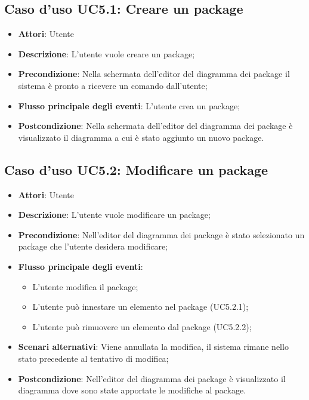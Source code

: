 \documentclass[../AnalisiDeiRequisiti.tex]{subfiles}
\begin{document}
			\subsection{Caso d'uso UC5.1: Creare un package}
			\begin{itemize}
				\item \textbf{Attori}: Utente
				\item \textbf{Descrizione}: L'utente vuole creare un package;
				\item \textbf{Precondizione}: Nella schermata dell'editor del diagramma dei package il sistema è pronto a ricevere un comando dall'utente;
				\item \textbf{Flusso principale degli eventi}: L'utente crea un package;
				\item \textbf{Postcondizione}: Nella schermata dell'editor del diagramma dei package è visualizzato il diagramma a cui è stato aggiunto un nuovo package.
			\end{itemize}
			\subsection{Caso d'uso UC5.2: Modificare un package}
			\begin{itemize}
				\item \textbf{Attori}: Utente
				\item \textbf{Descrizione}: L'utente vuole modificare un package;
				\item \textbf{Precondizione}: Nell'editor del diagramma dei package è stato selezionato un package che l'utente desidera modificare;
				\item \textbf{Flusso principale degli eventi}: \begin{itemize}
					\item L'utente modifica il package;
					\item L'utente può innestare un elemento nel package (UC5.2.1);
					\item L'utente può rimuovere un elemento dal package (UC5.2.2);
				\end{itemize}
				\item \textbf{Scenari alternativi}: Viene annullata la modifica, il sistema	rimane nello stato precedente al tentativo di modifica;
				\item \textbf{Postcondizione}: Nell'editor del diagramma dei package è visualizzato il diagramma dove sono state apportate le modifiche al package.
			\end{itemize}
\end{document}
